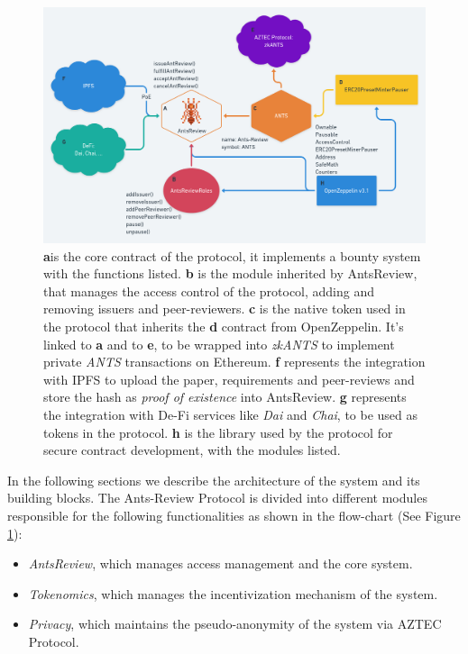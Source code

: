 \documentclass[runningheads]{llncs}
\begin{document}
\begin{figure}
\centering
\includegraphics[scale=0.28]{AntsReview}
\caption{\textbf{a}is the core contract of the protocol, it implements a bounty system with the functions listed.
\textbf{b} is the module inherited by AntsReview, that manages the access control of the protocol, adding and removing issuers and peer-reviewers.
\textbf{c} is the native token used in the protocol that inherits the \textbf{d} contract from OpenZeppelin. It's linked to \textbf{a} and to \textbf{e}, to be wrapped into \emph{zkANTS} to implement private \emph{ANTS} transactions on Ethereum.
\textbf{f} represents the integration with IPFS to upload the paper, requirements and peer-reviews and store the hash as \emph{proof of existence} into AntsReview.
\textbf{g} represents the integration with De-Fi services like \emph{Dai} and \emph{Chai}, to be used as tokens in the protocol.
\textbf{h} is the library used by the protocol for secure contract development, with the modules listed.}
\label{fig:contracts}
\end{figure}

In the following sections we describe the architecture of the system and its building blocks.
\newline The Ants-Review Protocol is divided into different modules responsible for the following functionalities as shown in the flow-chart (See Figure \ref{fig:contracts}):

\begin{itemize}
\item \emph{AntsReview}, which manages access management and the core system.
\item \emph{Tokenomics}, which manages the incentivization mechanism of the system.
\item \emph{Privacy}, which maintains the pseudo-anonymity of the system via AZTEC Protocol.
\end{itemize}
\end{document}

